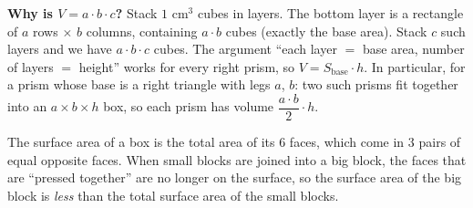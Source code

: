 \documentclass[11pt]{article}
\begin{document}
\begin{proofbox}
\textbf{Why is $V=a\cdot b\cdot c$?} Stack $1\text{ cm}^3$ cubes in layers. The bottom layer is a rectangle of $a$ rows $\times$ $b$ columns, containing $a\cdot b$ cubes (exactly the base area). Stack $c$ such layers and we have $a\cdot b\cdot c$ cubes. The argument ``each layer $=$ base area, number of layers $=$ height'' works for every right prism, so $V=S_{\text{base}}\cdot h$. In particular, for a prism whose base is a right triangle with legs $a$, $b$: two such prisms fit together into an $a\times b\times h$ box, so each prism has volume $\dfrac{a\cdot b}{2}\cdot h$.
\end{proofbox}

\begin{tipbox}
The surface area of a box is the total area of its $6$ faces, which come in $3$ pairs of equal opposite faces. When small blocks are joined into a big block, the faces that are ``pressed together'' are no longer on the surface, so the surface area of the big block is \emph{less} than the total surface area of the small blocks.
\end{tipbox}
\end{document}
